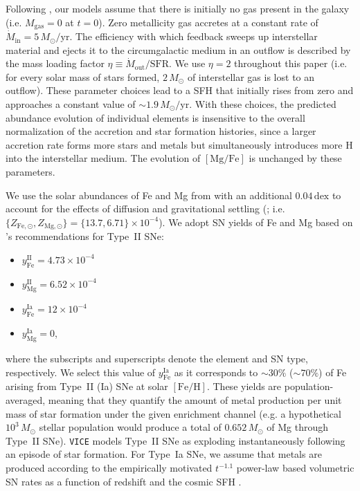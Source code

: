 \documentclass[twocolumn,linenumbers]{aastex631}
\newcommand{\Msun}{\ensuremath{M_{\odot}}}
\newcommand{\FeH}{\ensuremath{[\textrm{Fe}/\textrm{H}]}}
\newcommand{\MgFe}{\ensuremath{[\textrm{Mg}/\textrm{Fe}]}}
\newcommand{\dex}{\ensuremath{\textrm{dex}}}
\newcommand{\Msunyr}{\ensuremath{\Msun/\textrm{yr}}}
\newcommand{\SFR}{\ensuremath{\textrm{SFR}}}
\begin{document}
Following \citet{2022arXiv220402989C}, our models assume that there is initially no gas present in the galaxy (i.e. $M_{\textrm{gas}} = 0$ at $t = 0$). Zero metallicity gas accretes at a constant rate of $\dot{M}_\text{in} = 5\,\Msunyr$. The efficiency with which feedback sweeps up interstellar material and ejects it to the circumgalactic medium in an outflow is described by the mass loading factor $\eta \equiv \dot{M}_\text{out} / \SFR$. We use $\eta = 2$ throughout this paper (i.e. for every solar mass of stars formed, $2\,\Msun$ of interstellar gas is lost to an outflow). These parameter choices lead to a SFH that initially rises from zero and approaches a constant value of $\sim1.9\,\Msunyr$. With these choices, the predicted abundance evolution of individual elements is insensitive to the overall normalization of the accretion and star formation histories, since a larger accretion rate forms more stars and metals but simultaneously introduces more H into the interstellar medium. The evolution of \MgFe{} is unchanged by these parameters.

We use the solar abundances of Fe and Mg from \citet{Magg2022} with an additional $0.04\,\dex$ to account for the effects of diffusion and gravitational settling (\citealt{Turcotte1998}; i.e. $\{Z_{\text{Fe},\odot}, Z_{\text{Mg},\odot}\} = \{13.7, 6.71\} \times 10^{-4}$). We adopt SN yields of Fe and Mg based on \citeauthor{2024ApJ...973..122W}'s \citeyearpar{2024ApJ...973..122W} recommendations for Type~II SNe:
\begin{itemize}

	\item $y_\text{Fe}^\text{II} = 4.73 \times 10^{-4}$

	\item $y_\text{Mg}^\text{II} = 6.52 \times 10^{-4}$

	\item $y_\text{Fe}^\text{Ia} = 12 \times 10^{-4}$

	\item $y_\text{Mg}^\text{Ia} = 0$,

\end{itemize}
where the subscripts and superscripts denote the element and SN type, respectively. We select this value of $y_\text{Fe}^\text{Ia}$ as it corresponds to $\sim30\%$ ($\sim70\%$) of Fe arising from Type~II (Ia) SNe at solar \FeH{}. These yields are population-averaged, meaning that they quantify the amount of metal production per unit mass of star formation under the given enrichment channel (e.g. a hypothetical $10^3\,\Msun$ stellar population would produce a total of $0.652\,\Msun$ of Mg through Type~II SNe). {\tt VICE} models Type~II SNe as exploding instantaneously following an episode of star formation. For Type~Ia SNe, we assume that metals are produced according to the empirically motivated $t^{-1.1}$ power-law based volumetric SN rates as a function of redshift and the cosmic SFH \citep[e.g.][]{Maoz2012}.
\end{document}
